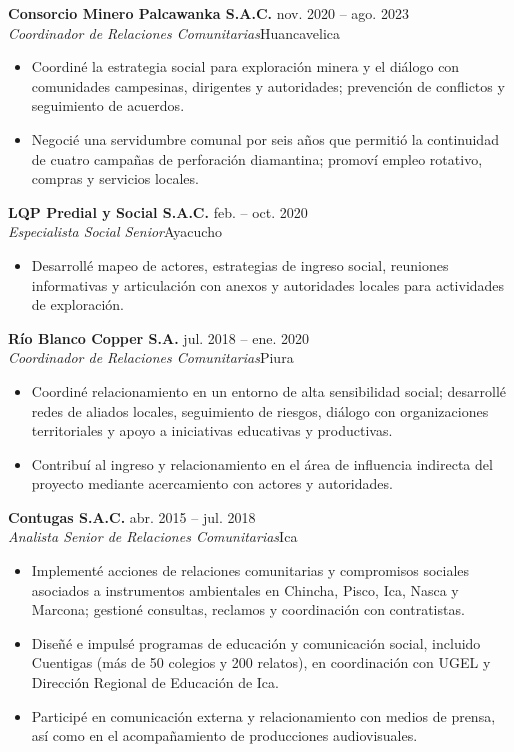 \documentclass[10pt,a4paper]{article}
\newcommand{\trabajo}[4]{%
  \vspace{5pt}\textbf{#1} \hfill {\small\color{muted}#3}\\
  {\color{teal}\itshape #2}\hfill{\small\color{muted}#4}\par\vspace{1pt}}
\begin{document}
\trabajo{Consorcio Minero Palcawanka S.A.C.}{Coordinador de Relaciones Comunitarias}{nov. 2020 – ago. 2023}{Huancavelica}
\begin{itemize}
  \item Coordiné la estrategia social para exploración minera y el diálogo con comunidades campesinas, dirigentes y autoridades; prevención de conflictos y seguimiento de acuerdos.
  \item Negocié una servidumbre comunal por seis años que permitió la continuidad de cuatro campañas de perforación diamantina; promoví empleo rotativo, compras y servicios locales.
\end{itemize}

\trabajo{LQP Predial y Social S.A.C.}{Especialista Social Senior}{feb. – oct. 2020}{Ayacucho}
\begin{itemize}
  \item Desarrollé mapeo de actores, estrategias de ingreso social, reuniones informativas y articulación con anexos y autoridades locales para actividades de exploración.
\end{itemize}

\trabajo{Río Blanco Copper S.A.}{Coordinador de Relaciones Comunitarias}{jul. 2018 – ene. 2020}{Piura}
\begin{itemize}
  \item Coordiné relacionamiento en un entorno de alta sensibilidad social; desarrollé redes de aliados locales, seguimiento de riesgos, diálogo con organizaciones territoriales y apoyo a iniciativas educativas y productivas.
  \item Contribuí al ingreso y relacionamiento en el área de influencia indirecta del proyecto mediante acercamiento con actores y autoridades.
\end{itemize}

\trabajo{Contugas S.A.C.}{Analista Senior de Relaciones Comunitarias}{abr. 2015 – jul. 2018}{Ica}
\begin{itemize}
  \item Implementé acciones de relaciones comunitarias y compromisos sociales asociados a instrumentos ambientales en Chincha, Pisco, Ica, Nasca y Marcona; gestioné consultas, reclamos y coordinación con contratistas.
  \item Diseñé e impulsé programas de educación y comunicación social, incluido Cuentigas (más de 50 colegios y 200 relatos), en coordinación con UGEL y Dirección Regional de Educación de Ica.
  \item Participé en comunicación externa y relacionamiento con medios de prensa, así como en el acompañamiento de producciones audiovisuales.
\end{itemize}
\end{document}
